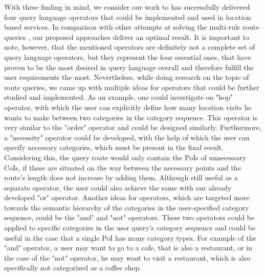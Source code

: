 With these finding in mind, we consider our work to has successfully delivered four query language operators that could be implemented and used in location based services. In comparison with other attempts at solving the multi-rule route queries \cite{multi}, our proposed approaches deliver an optimal result. It is important to note, however, that the mentioned operators are definitely not a complete set of query language operators, but they represent the four essential ones, that have proven to be the most desired in query language overall and therefore fulfill the user requirements the most. Nevertheless, while doing research on the topic of route queries, we came up with multiple ideas for operators that could be further studied and implemented. As an example, one could investigate on "hop" operator, with which the user can explicitly define how many location visits he wants to make between two categories in the category sequence. This operator is very similar to the "order" operator and could be designed similarly. Furthermore, a "necessity" operator could be developed, with the help of which the user can specify necessary categories, which must be present in the final result. Considering this, the query route would only contain the PoIs of unnecessary CoIs, if these are situated on the way between the necessary points and the route's length does not increase by adding them. Although still useful as a separate operator, the user could also achieve the same with our already developed "or" operator. \newline
Another ideas for operators, which are targeted more towards the semantic hierarchy of the categories in the user-specified category sequence, could be the "and" and "not" operators. These two operators could be applied to specific categories in the user query's category sequence and could be useful in the case that a single PoI has many category types. For example of the "and" operator, a user may want to go to a cafe, that is also a restaurant, or in the case of the "not" operator, he may want to visit a restaurant, which is also specifically not categorized as a coffee shop. \newline
